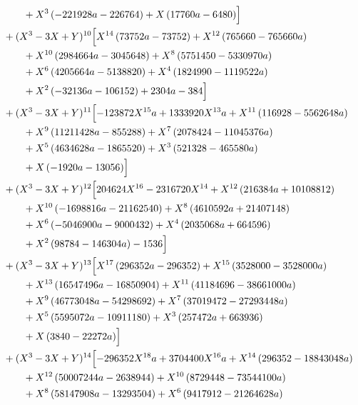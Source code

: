 \begin{align*}
&\qquad + X^{3} \left(- 221928 a - 226764\right) + X \left(17760 a - 6480\right)\Bigr]\\
&{}+(X^3-3X+Y)^{10}\Bigl[X^{14} \left(73752 a - 73752\right) + X^{12} \left(765660 - 765660 a\right)\\
&\qquad + X^{10} \left(2984664 a - 3045648\right) + X^{8} \left(5751450 - 5330970 a\right)\\
&\qquad + X^{6} \left(4205664 a - 5138820\right) + X^{4} \left(1824990 - 1119522 a\right)\\
&\qquad + X^{2} \left(- 32136 a - 106152\right) + 2304 a - 384\Bigr]\\
&{}+(X^3-3X+Y)^{11}\Bigl[- 123872 X^{15} a + 1333920 X^{13} a + X^{11} \left(116928 - 5562648 a\right)\\
&\qquad + X^{9} \left(11211428 a - 855288\right) + X^{7} \left(2078424 - 11045376 a\right)\\
&\qquad + X^{5} \left(4634628 a - 1865520\right) + X^{3} \left(521328 - 465580 a\right)\\
&\qquad + X \left(- 1920 a - 13056\right)\Bigr]\\
&{}+(X^3-3X+Y)^{12}\Bigl[204624 X^{16} - 2316720 X^{14} + X^{12} \left(216384 a + 10108812\right)\\
&\qquad + X^{10} \left(- 1698816 a - 21162540\right) + X^{8} \left(4610592 a + 21407148\right)\\
&\qquad + X^{6} \left(- 5046900 a - 9000432\right) + X^{4} \left(2035068 a + 664596\right)\\
&\qquad + X^{2} \left(98784 - 146304 a\right) - 1536\Bigr]\\
&{}+(X^3-3X+Y)^{13}\Bigl[X^{17} \left(296352 a - 296352\right) + X^{15} \left(3528000 - 3528000 a\right)\\
&\qquad + X^{13} \left(16547496 a - 16850904\right) + X^{11} \left(41184696 - 38661000 a\right)\\
&\qquad + X^{9} \left(46773048 a - 54298692\right) + X^{7} \left(37019472 - 27293448 a\right)\\
&\qquad + X^{5} \left(5595072 a - 10911180\right) + X^{3} \left(257472 a + 663936\right)\\
&\qquad + X \left(3840 - 22272 a\right)\Bigr]\\
&{}+(X^3-3X+Y)^{14}\Bigl[- 296352 X^{18} a + 3704400 X^{16} a + X^{14} \left(296352 - 18843048 a\right)\\
&\qquad + X^{12} \left(50007244 a - 2638944\right) + X^{10} \left(8729448 - 73544100 a\right)\\
&\qquad + X^{8} \left(58147908 a - 13293504\right) + X^{6} \left(9417912 - 21264628 a\right)\\

\end{align*}
